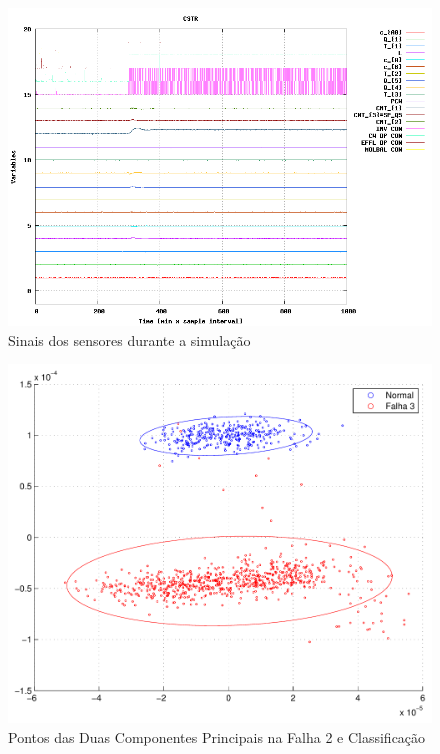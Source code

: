 \documentclass[journal]{IEEEtran}
\begin{document}
\begin{figure}[H]
	\centering
  	\includegraphics[scale=0.5]{figs/fault2/sinal_falha_2.png}
  	\caption{Sinais dos sensores durante a simulação}
	\label{fig:f2:s}
\end{figure}

\begin{figure}[H]
	\centering
  \includegraphics[scale=0.6]{figs/fault2/pontos2D.pdf}
  \caption{Pontos das Duas Componentes Principais na Falha 2 e Classificação}
	\label{fig:f2:2d}
\end{figure}
\end{document}
